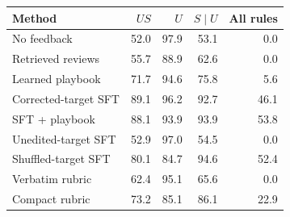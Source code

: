 \begin{tabular}{@{}lrrrr@{}}
\toprule
Method & $US$ & $U$ & $S\mid U$ & All rules \\
\midrule
No feedback & 52.0 & 97.9 & 53.1 & 0.0 \\
Retrieved reviews & 55.7 & 88.9 & 62.6 & 0.0 \\
Learned playbook & 71.7 & 94.6 & 75.8 & 5.6 \\
Corrected-target SFT & 89.1 & 96.2 & 92.7 & 46.1 \\
SFT + playbook & 88.1 & 93.9 & 93.9 & 53.8 \\
Unedited-target SFT & 52.9 & 97.0 & 54.5 & 0.0 \\
Shuffled-target SFT & 80.1 & 84.7 & 94.6 & 52.4 \\
\midrule
Verbatim rubric & 62.4 & 95.1 & 65.6 & 0.0 \\
Compact rubric & 73.2 & 85.1 & 86.1 & 22.9 \\
\bottomrule
\end{tabular}

